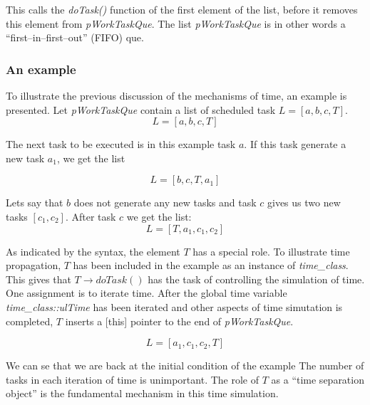 	This calls the \emph{doTask()} function of the first element of the list, before it removes this element from \emph{pWorkTaskQue}.
	The list \emph{pWorkTaskQue} is in other words a ``first--in--first--out'' (FIFO) que. %
	
	\subsubsection{An example}
	To illustrate the previous discussion of the mechanisms of time, an example is presented.
	Let \emph{pWorkTaskQue} contain a list of scheduled task $L = [a, b, c, T]$.
\begin{equation}
	\nonumber
	L = [a, b, c, T]
\end{equation}

	The next task to be executed is in this example task $a$.
	If this task generate a new task $a_1$, we get the list



\begin{equation}
	\nonumber
	L = [b, c, T, a_1]
\end{equation}

Lets say that $b$ does not generate any new tasks and task $c$ gives us two new tasks $[c_1, c_2]$. After task $c$ we get the list:
\begin{equation}
	\nonumber
	L = [T, a_1, c_1, c_2 ]
\end{equation}

As indicated by the syntax, the element $T$ has a special role.
To illustrate time propagation, $T$ has been included in the example as an instance of \emph{time\_class}.
This gives that $T\rightarrow doTask()$ has the task of controlling the simulation of time. 
One assignment is to iterate time.
After the global time variable \emph{time\_class::ulTime} has been iterated and other aspects of time simutation is completed, $T$ inserts a [this] pointer to the end of \emph{pWorkTaskQue}.


\begin{equation}
	\nonumber
	L = [a_1, c_1, c_2, T ]
\end{equation}

We can se that we are back at the initial condition of the example
The number of tasks in each iteration of time is unimportant. 
The role of $T$ as a ``time separation object'' is the fundamental mechanism in this time simulation.

